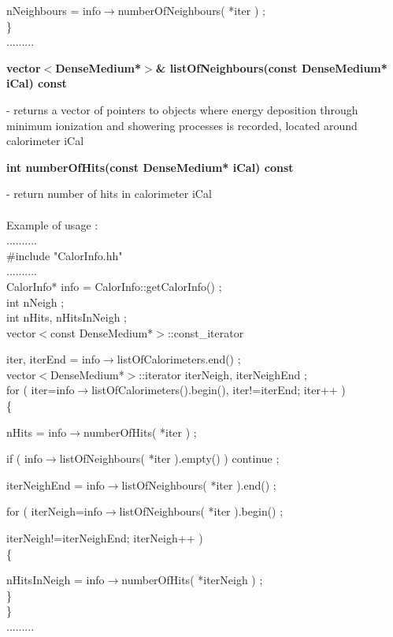       nNeighbours = info$\rightarrow$numberOfNeighbours( *iter ) ; \\
   \} \\
   ......... \\
   
   
\begin{center}
   {\bf vector$<$DenseMedium*$>$\& listOfNeighbours(const DenseMedium* iCal) const}
\end{center}
   - returns a vector of pointers to objects where energy deposition through minimum 
   ionization and showering processes is recorded, located around 
   calorimeter iCal
   
\begin{center}
   {\bf int numberOfHits(const DenseMedium* iCal) const }
\end{center}
   - return number of hits in calorimeter iCal \\
   \\
   Example of usage : \\
   .......... \\
   \#include "CalorInfo.hh" \\
   .......... \\
   CalorInfo* info = CalorInfo::getCalorInfo() ; \\
   int nNeigh ; \\
   int nHits, nHitsInNeigh ;\\
   vector$<$const DenseMedium*$>$::const\_iterator

      iter, iterEnd = info$\rightarrow$listOfCalorimeters.end() ; \\  
   vector$<$DenseMedium*$>$::iterator iterNeigh, iterNeighEnd ;\\
   for ( iter=info$\rightarrow$listOfCalorimeters().begin(), iter!=iterEnd; iter++ )\\
   \{ 

      nHits = info$\rightarrow$numberOfHits( *iter ) ; 

      if ( info$\rightarrow$listOfNeighbours( *iter ).empty() ) continue ; 

      iterNeighEnd = info$\rightarrow$listOfNeighbours( *iter ).end() ; 

      for ( iterNeigh=info$\rightarrow$listOfNeighbours( *iter ).begin() ; 

            iterNeigh!=iterNeighEnd; iterNeigh++ ) \\
      \{ 

         nHitsInNeigh = info$\rightarrow$numberOfHits( *iterNeigh ) ;\\
      \} \\
   \} \\
   .........\\


